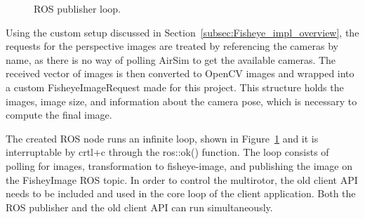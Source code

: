 \begin{figure}[!htb]
    \caption{ROS publisher loop.}
    \label{fig:impl_ROS_pub_loop}
\end{figure}

Using the custom setup discussed in Section~\ref{subsec:Fisheye_impl_overview}, the requests for the perspective images are treated by referencing the cameras by name, as there is no way of polling AirSim to get the available cameras. The received vector of images is then converted to OpenCV images and wrapped into a custom FisheyeImageRequest made for this project. This structure holds the images, image size, and information about the camera pose, which is necessary to compute the final image.

The created ROS node runs an infinite loop, shown in Figure~\ref{fig:impl_ROS_pub_loop} and it is interruptable by crtl+c through the ros::ok() function. The loop consists of polling for images, transformation to fisheye-image, and publishing the image on the FisheyImage ROS topic. In order to control the multirotor, the old client API needs to be included and used in the core loop of the client application. Both the ROS publisher and the old client API can run simultaneously.


\cleardoublepage